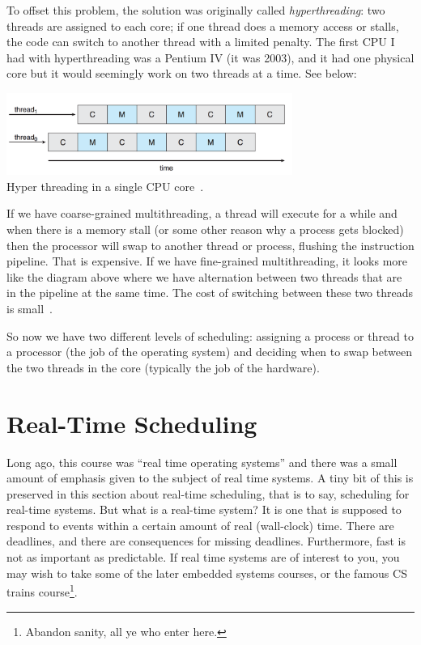 To offset this problem, the solution was originally called \textit{hyperthreading}: two threads are assigned to each core; if one thread does a memory access or stalls, the code can switch to another thread with a limited penalty. The first CPU I had with hyperthreading was a Pentium IV (it was 2003), and it had one physical core but it would seemingly work on two threads at a time. See below:

\begin{center}
	\includegraphics[width=0.7\textwidth]{images/hyperthreading.png}\\
	Hyper threading in a single CPU core~\cite{osc}.
\end{center}

If we have coarse-grained multithreading, a thread will execute for a while and when there is a memory stall (or some other reason why a process gets blocked) then the processor will swap to another thread or process, flushing the instruction pipeline. That is expensive. If we have fine-grained multithreading, it looks more like the diagram above where we have alternation between two threads that are in the pipeline at the same time. The cost of switching between these two threads is small~\cite{osc}.

So now we have two different levels of scheduling: assigning a process or thread to a processor (the job of the operating system) and deciding when to swap between the two threads in the core (typically the job of the hardware). 

\section*{Real-Time Scheduling}
Long ago, this course was ``real time operating systems'' and there was a small amount of emphasis given to the subject of real time systems. A tiny bit of this is preserved in this section about real-time scheduling, that is to say, scheduling for real-time systems. But what is a real-time system? It is one that is supposed to respond to events within a certain amount of real (wall-clock) time. There are deadlines, and there are consequences for missing deadlines. Furthermore, fast is not as important as predictable. If real time systems are of interest to you, you may wish to take some of the later embedded systems courses, or the famous CS trains course\footnote{Abandon sanity, all ye who enter here.}.

